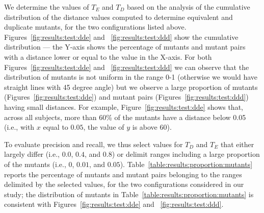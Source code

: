 We determine the values of $T_E$ and $T_D$ based on the analysis of the 
cumulative distribution of the distance values computed to determine equivalent and duplicate mutants, for the two configurations listed above.
Figures~\ref{fig:results:test:dde} and
~\ref{fig:results:test:ddd}
show the cumulative distribution --- the Y-axis shows the percentage of mutants and mutant pairs with a distance lower or equal to the value in the X-axis.
For both Figures~\ref{fig:results:test:dde} and
~\ref{fig:results:test:ddd} we can observe that the distribution of mutants is not uniform in the range 0-1 (otherwise we would have straight lines with 45 degree angle) but we observe a large proportion of mutants (Figures~\ref{fig:results:test:dde}) and mutant pairs (Figures~\ref{fig:results:test:ddd}) having small distances. For example,
Figure~\ref{fig:results:test:dde} shows that, across all subjects, more than 60\% of the mutants have a distance below 0.05 (i.e., with $x$ equal to $0.05$, the value of $y$ is above $60$). 

To evaluate precision and recall, we thus select values for $T_D$ and $T_E$ that 
either largely differ (i.e., $0.0$, $0.4$, and $0.8$) or delimit ranges including a large proportion of the mutants (i.e., $0$, $0.01$, and $0.05$). Table~\ref{table:results:proportion:mutants} reports the percentage of mutants and mutant pairs belonging to the ranges delimited by the selected values, for the two configurations considered in our study; the distribution of mutants in Table~\ref{table:results:proportion:mutants} is consistent with Figures~\ref{fig:results:test:dde} and
~\ref{fig:results:test:ddd}.









